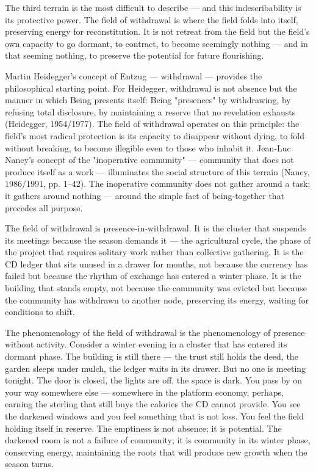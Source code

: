 The third terrain is the most difficult to describe — and this indescribability is its protective power. The field of withdrawal is where the field folds into itself, preserving energy for reconstitution. It is not retreat from the field but the field's own capacity to go dormant, to contract, to become seemingly nothing — and in that seeming nothing, to preserve the potential for future flourishing.

Martin Heidegger's concept of Entzug — withdrawal — provides the philosophical starting point. For Heidegger, withdrawal is not absence but the manner in which Being presents itself: Being "presences" by withdrawing, by refusing total disclosure, by maintaining a reserve that no revelation exhausts (Heidegger, 1954/1977). The field of withdrawal operates on this principle: the field's most radical protection is its capacity to disappear without dying, to fold without breaking, to become illegible even to those who inhabit it. Jean-Luc Nancy's concept of the "inoperative community" — community that does not produce itself as a work — illuminates the social structure of this terrain (Nancy, 1986/1991, pp. 1–42). The inoperative community does not gather around a task; it gathers around nothing — around the simple fact of being-together that precedes all purpose.

The field of withdrawal is presence-in-withdrawal. It is the cluster that suspends its meetings because the season demands it — the agricultural cycle, the phase of the project that requires solitary work rather than collective gathering. It is the CD ledger that sits unused in a drawer for months, not because the currency has failed but because the rhythm of exchange has entered a winter phase. It is the building that stands empty, not because the community was evicted but because the community has withdrawn to another node, preserving its energy, waiting for conditions to shift.

The phenomenology of the field of withdrawal is the phenomenology of presence without activity. Consider a winter evening in a cluster that has entered its dormant phase. The building is still there — the trust still holds the deed, the garden sleeps under mulch, the ledger waits in its drawer. But no one is meeting tonight. The door is closed, the lights are off, the space is dark. You pass by on your way somewhere else — somewhere in the platform economy, perhaps, earning the sterling that still buys the calories the CD cannot provide. You see the darkened windows and you feel something that is not loss. You feel the field holding itself in reserve. The emptiness is not absence; it is potential. The darkened room is not a failure of community; it is community in its winter phase, conserving energy, maintaining the roots that will produce new growth when the season turns.

